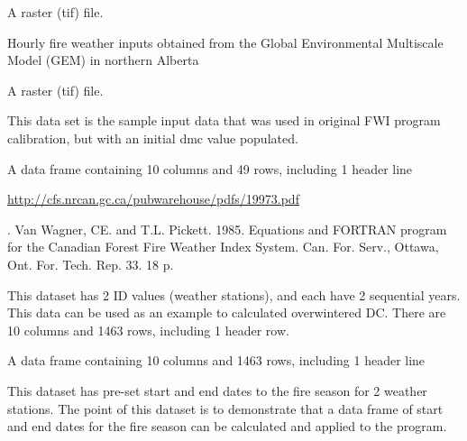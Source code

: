 \documentclass[a4paper]{book}
\begin{document}
%
\begin{Format}
A raster (tif) file.
\end{Format}
%
\begin{Description}\relax
Hourly fire weather inputs obtained from the Global Environmental Multiscale
Model (GEM) in northern Alberta
\end{Description}
%
\begin{Format}
A raster (tif) file.
\end{Format}
%
\begin{Description}\relax
This data set is the sample input data that was used in original FWI program
calibration, but with an initial dmc value populated.
\end{Description}
%
\begin{Format}
A data frame containing 10 columns and 49 rows, including 1 header
line
\end{Format}
%
\begin{Source}\relax
\url{http://cfs.nrcan.gc.ca/pubwarehouse/pdfs/19973.pdf}
\end{Source}
%
\begin{References}. Van Wagner, CE. and T.L. Pickett. 1985. Equations and FORTRAN
program for the Canadian Forest Fire Weather Index System. Can. For. Serv.,
Ottawa, Ont. For. Tech. Rep. 33. 18 p.
\end{References}
%
\begin{Description}\relax
This dataset has 2 ID values (weather stations), and each have 2 sequential
years. This data can be used as an example to calculated overwintered DC.
There are 10 columns and 1463 rows, including 1 header row.
\end{Description}
%
\begin{Format}
A data frame containing 10 columns and 1463 rows, including 1 header
line
\end{Format}
%
\begin{Description}\relax
This dataset has pre-set start and end dates to the fire season for 2
weather stations. The point of this dataset is to demonstrate that a data
frame of start and end dates for the fire season can be calculated and
applied to the program.
\end{Description}
\end{document}
